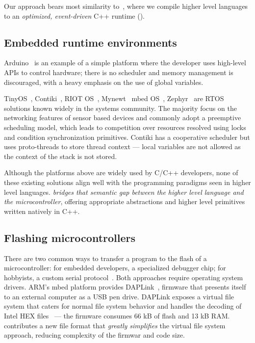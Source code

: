 Our approach bears most similarity to~\cite{varma2004java}, where we compile higher level languages to an \emph{optimized, event-driven} C++ runtime (\CON).

\subsection{Embedded runtime environments}


Arduino~\cite{buildingArduino2014} is an example of a simple platform where the developer uses high-level APIs to control hardware; there is no scheduler and memory management is discouraged, with a heavy emphasis on 
the use of global variables.

TinyOS~\cite{levis2005tinyos}, Contiki~\cite{dunkels2012contiki}, RIOT OS~\cite{baccelli2013riot}, Mynewt~\cite{ApacheMy53:online} mbed OS~\cite{ARMmbed}, Zephyr~\cite{HomeZeph63:online} are RTOS solutions known widely in the systems community. The majority focus on the networking features of sensor based devices and commonly adopt a preemptive scheduling model, which leads to competition over resources resolved using locks and condition synchronization primitives. Contiki has a cooperative scheduler but uses proto-threads to store thread context --- local variables are not allowed as the context of the stack is not stored.

Although the platforms above are widely used by C/C++ developers, none of these existing solutions align well with the programming paradigms seen in higher level languages. \CO \emph{bridges that semantic gap between the higher level language and the microcontroller}, offering appropriate abstractions and higher level primitives written natively in C++.

\subsection{Flashing microcontrollers}

There are two common ways to transfer a program to the flash of a microcontroller: for embedded developers, a specialized debugger chip; for hobbyists, a custom serial protocol~\cite{AVRDUDEA15:online}. Both approaches require operating system drivers. ARM's mbed platform provides DAPLink~\cite{GitHubAR5:online}, firmware that presents itself to an external computer as a USB pen drive. DAPLink exposes a virtual file system that caters for normal file system behavior and handles the decoding of Intel HEX files~\cite{IntelHEX} --- the firmware consumes 66 kB of flash and 13 kB RAM. \UF contributes a new file format that \emph{greatly simplifies} the virtual file system approach, reducing complexity of the firmwar and code size.

